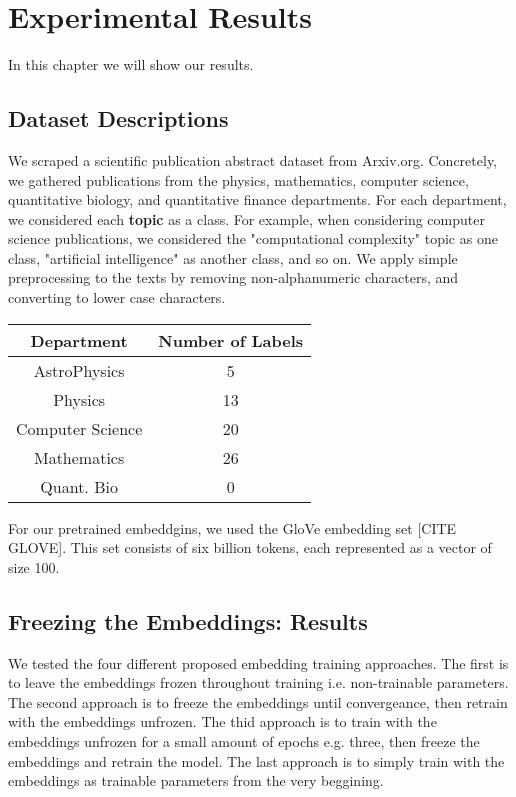 
\chapter{Experimental Results} \label{Results}
In this chapter we will show our results.

\section{Dataset Descriptions}

We scraped a scientific publication abstract dataset from Arxiv.org. Concretely, we gathered
publications from the physics, mathematics, computer science, quantitative biology,
and quantitative finance departments. For each department, we considered each \textbf{topic} as a
class. For example, when considering computer science publications, we considered the
"computational complexity" topic as one class, "artificial intelligence" as another class,
and so on. We apply simple preprocessing to the texts by removing non-alphanumeric
characters, and converting to lower case characters.

\begin{center}\begin{tabular}{||c c||}
 \hline
 Department & Number of Labels\\ [0.5ex]
 \hline\hline
AstroPhysics & 5\\
Physics & 13\\
Computer Science & 20\\
Mathematics & 26\\
Quant. Bio & 0\\
 [1ex]\hline\end{tabular}\end{center}

For our pretrained embeddgins, we used the GloVe embedding set [CITE GLOVE]. This set consists of six billion tokens, each represented
as a vector of size 100.

\section{Freezing the Embeddings: Results}
We tested the four different proposed embedding training approaches.
The first is to leave the embeddings frozen throughout training i.e. non-trainable parameters.
The second approach is to freeze the embeddings until convergeance, then retrain with the embeddings unfrozen.
The thid approach is to train with the embeddings unfrozen for a small amount of epochs e.g. three, then
freeze the embeddings and retrain the model.
The last approach is to simply train with the embeddings as trainable parameters from the very beggining.

